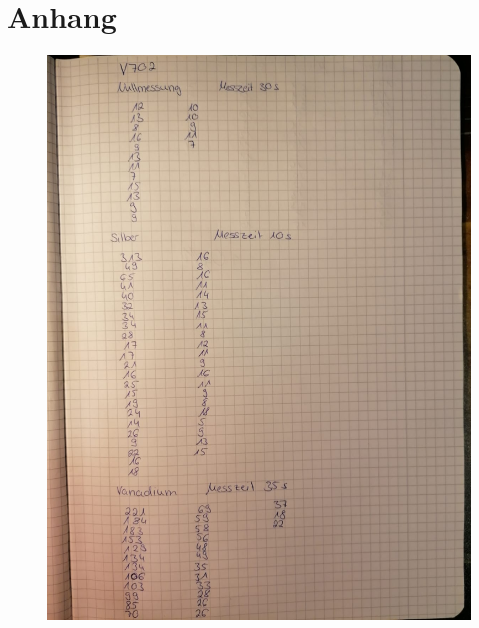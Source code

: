 \section{Anhang}
\begin{figure}
    \centering
    \includegraphics[width=\textwidth]{content/Anhang 1.jpg}
\end{figure}
    
